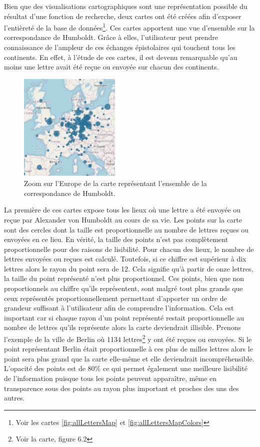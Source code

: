 \documentclass[a4paper, 12pt, twoside]{book}
\begin{document}
Bien que des visualisations cartographiques sont une représentation possible du résultat d'une fonction de recherche, deux cartes ont été créées afin d'exposer l'entièreté de la base de données\footnote{Voir les cartes \autoref{fig:allLettersMap} et \autoref{fig:allLettersMapColors}}. Ces cartes apportent une vue d'ensemble sur la correspondance de Humboldt. Grâce à elles, l'utilisateur peut prendre connaissance de l'ampleur de ces échanges épistolaires qui touchent tous les continents. En effet, à l'étude de ces cartes, il est devenu remarquable qu'au moins une lettre avait été reçue ou envoyée sur chacun des continents.

\begin{figure}
\vspace{-25pt}
\includegraphics[width=0.43\textwidth]{img/mapviz_europe_extrait.jpg}
\caption{Zoom sur l'Europe de la carte représentant l'ensemble de la correspondance de Humboldt.}
\vspace{-15pt}
\end{figure}
La première de ces cartes expose tous les lieux où une lettre a été envoyée ou reçue par Alexander von Humboldt au cours de sa vie. Les points sur la carte sont des cercles dont la taille est proportionnelle au nombre de lettres reçues ou envoyées en ce lieu. En vérité, la taille des points n'est pas complètement proportionnelle pour des raisons de lisibilité. Pour chacun des lieux, le nombre de lettres envoyées ou reçues est calculé. Toutefois, si ce chiffre est supérieur à dix lettres alors le rayon du point sera de 12. Cela signifie qu'à partir de onze lettres, la taille du point représenté n'est plus proportionnel. Ces points, bien que non proportionnels au chiffre qu'ils représentent, sont malgré tout plus grands que ceux représentés proportionnellement permettant d'apporter un ordre de grandeur suffisant à l'utilisateur afin de comprendre l'information. Cela est important car si chaque rayon d'un point représenté restait proportionnelle au nombre de lettres qu'ils représente alors la carte deviendrait illisible. Prenons l'exemple de la ville de Berlin où 1134 lettres\footnote{Voir la carte, figure 6.2} y ont été reçues ou envoyées. Si le point représentant Berlin était proportionnelle à ces plus de milles lettres alors le point sera plus grand que la carte elle-même et elle deviendrait incompréhensible. L'opacité des points est de 80\% ce qui permet également une meilleure lisibilité de l'information puisque tous les points peuvent apparaître, même en transparence sous des points au rayon plus important et proches des uns des autres.
\end{document}
